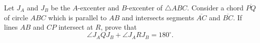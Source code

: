 Let $J_A$ and $J_B$ be the $A$-excenter and $B$-excenter of $\triangle ABC$. Consider a chord $\overline{PQ}$ of circle $ABC$ which is parallel to $AB$ and intersects segments $\overline{AC}$ and $\overline{BC}$. If lines $AB$ and $CP$ intersect at $R$, prove that
$$\angle J_AQJ_B+\angle J_ARJ_B=180^\circ.$$